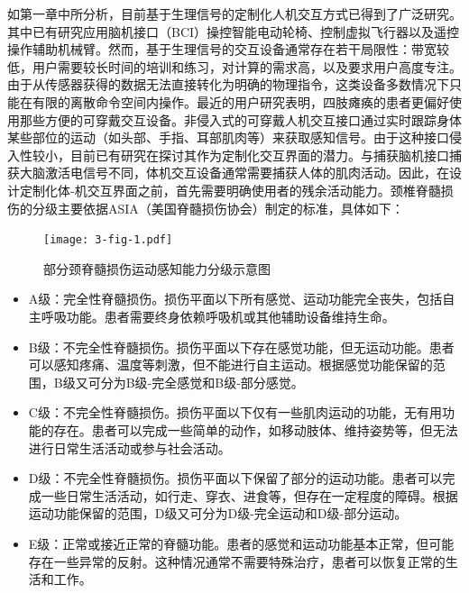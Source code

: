如第一章中所分析，目前基于生理信号的定制化人机交互方式已得到了广泛研究。其中已有研究应用脑机接口（BCI）操控智能电动轮椅\cite{cruzSelfPacedBCICollaborative2021}、控制虚拟飞行器\cite{krygerFlightSimulationUsing2017}以及遥控操作辅助机械臂\cite{gilliniAssistiveSharedControl2021}。然而，基于生理信号的交互设备通常存在若干局限性：带宽较低，用户需要较长时间的培训和练习，对计算的需求高，以及要求用户高度专注。由于从传感器获得的数据无法直接转化为明确的物理指令，这类设备多数情况下只能在有限的离散命令空间内操作。最近的用户研究表明，四肢瘫痪的患者更偏好使用那些方便的可穿戴交互设备\cite{zhangUnderstandingInteractionsSmart2022}。非侵入式的可穿戴人机交互接口通过实时跟踪身体某些部位的运动（如头部、手指、耳部肌肉等）来获取感知信号。由于这种接口侵入性较小，目前已有研究在探讨其作为定制化交互界面的潜力\cite{miehlbradtDatadrivenBodyMachine2018a,zhouNonInvasiveHumanMachineInterface2022}。与捕获脑机接口捕获大脑激活电信号不同，体机交互设备通常需要捕获人体的肌肉活动。因此，在设计定制化体-机交互界面之前，首先需要明确使用者的残余活动能力。颈椎脊髓损伤的分级主要依据ASIA（美国脊髓损伤协会）制定的标准\cite{SpinalCordInjury}，具体如下：

\begin{figure}[htb]
    \centering
    \texttt{[image: 3-fig-1.pdf]}
    \caption{部分颈脊髓损伤运动感知能力分级示意图}
    \label{3-fig-1}
\end{figure}    

\begin{itemize}
\item A级：完全性脊髓损伤。损伤平面以下所有感觉、运动功能完全丧失，包括自主呼吸功能。患者需要终身依赖呼吸机或其他辅助设备维持生命。
\item B级：不完全性脊髓损伤。损伤平面以下存在感觉功能，但无运动功能。患者可以感知疼痛、温度等刺激，但不能进行自主运动。根据感觉功能保留的范围，B级又可分为B级-完全感觉和B级-部分感觉。
\item C级：不完全性脊髓损伤。损伤平面以下仅有一些肌肉运动的功能，无有用功能的存在。患者可以完成一些简单的动作，如移动肢体、维持姿势等，但无法进行日常生活活动或参与社会活动。
\item D级：不完全性脊髓损伤。损伤平面以下保留了部分的运动功能。患者可以完成一些日常生活活动，如行走、穿衣、进食等，但存在一定程度的障碍。根据运动功能保留的范围，D级又可分为D级-完全运动和D级-部分运动。
\item E级：正常或接近正常的脊髓功能。患者的感觉和运动功能基本正常，但可能存在一些异常的反射。这种情况通常不需要特殊治疗，患者可以恢复正常的生活和工作。
\end{itemize}

